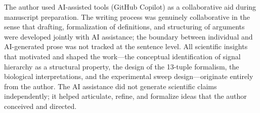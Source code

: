 \documentclass[10pt,letterpaper]{article}
\begin{document}
The author used AI-assisted tools (GitHub Copilot) as a collaborative aid during
manuscript preparation. The writing process was genuinely collaborative in the
sense that drafting, formalization of definitions, and structuring of arguments
were developed jointly with AI assistance; the boundary between individual and
AI-generated prose was not tracked at the sentence level. All scientific insights
that motivated and shaped the work---the conceptual identification of signal
hierarchy as a structural property, the design of the 13-tuple formalism, the
biological interpretations, and the experimental sweep design---originate
entirely from the author. The AI assistance did not generate scientific claims
independently; it helped articulate, refine, and formalize ideas that the author
conceived and directed.

%



\end{document}
